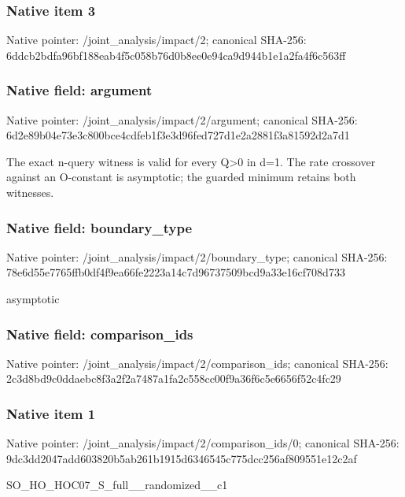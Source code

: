 \documentclass[10pt,a4paper]{article}
\begin{document}
\subsubsection{Native item 3}
Native pointer: /joint\_\allowbreak{}analysis/impact/2; canonical SHA-256: 6ddcb2bdfa96bf188eab4f5c058b76d0b8ee0e94ca9d944b1e1a2fa4f6c563ff

\subsubsection{Native field: argument}
Native pointer: /joint\_\allowbreak{}analysis/impact/2/argument; canonical SHA-256: 6d2e89b04e73e3c800bce4cdfeb1f3e3d96fed727d1e2a2881f3a81592d2a7d1

\begingroup\raggedright\sloppy The exact n-query witness is valid for every Q>0 in d=\allowbreak{}1. The rate crossover against an O-constant is asymptotic;\allowbreak{} the guarded minimum retains both witnesses.\par\endgroup

\subsubsection{Native field: boundary\_\allowbreak{}type}
Native pointer: /joint\_\allowbreak{}analysis/impact/2/boundary\_\allowbreak{}type; canonical SHA-256: 78e6d55e7765ffb0df4f9ea66fe2223a14c7d96737509bcd9a33e16cf708d733

\begingroup\raggedright\sloppy asymptotic\par\endgroup

\subsubsection{Native field: comparison\_\allowbreak{}ids}
Native pointer: /joint\_\allowbreak{}analysis/impact/2/comparison\_\allowbreak{}ids; canonical SHA-256: 2c3d8bd9c0ddaebc8f3a2f2a7487a1fa2c558cc00f9a36f6c5e6656f52c4fc29

\subsubsection{Native item 1}
Native pointer: /joint\_\allowbreak{}analysis/impact/2/comparison\_\allowbreak{}ids/0; canonical SHA-256: 9dc3dd2047add603820b5ab261b1915d6346545c775dcc256af809551e12c2af

\begingroup\raggedright\sloppy SO\_\allowbreak{}HO\_\allowbreak{}HOC07\_\allowbreak{}S\_\allowbreak{}full\_\allowbreak{}\_\allowbreak{}randomized\_\allowbreak{}\_\allowbreak{}c1\par\endgroup
\end{document}
